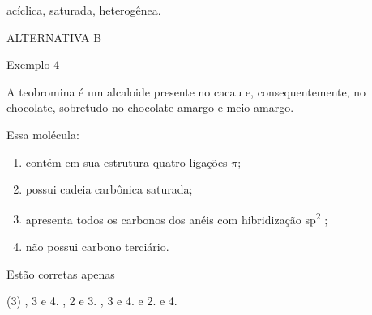\documentclass[presentation,professionalfonts,aspectratio=169]{beamer}
\begin{document}
\begin{frame}[label={sec:orgcf9bfd3}]{}
\begin{answer}[print=true]





\alert{acíclica, saturada, heterogênea.}


ALTERNATIVA \alert{B}
\end{answer}
\end{frame}
\begin{frame}[label={sec:org5857adc}]{Exemplo 4}
\begin{question}
\scriptsize
A teobromina é um alcaloide presente no cacau e, consequentemente, no chocolate, sobretudo no chocolate amargo e meio amargo. 

\begin{minipage}[b]{2.5cm}

\end{minipage}\hfill
\begin{minipage}[b]{8cm}
Essa molécula:
\begin{enumerate}[label=\Roman*]
\item contém em sua estrutura quatro ligações \(\pi\);
\item possui cadeia carbônica saturada;
\item apresenta todos os carbonos dos anéis com hibridização sp\textsuperscript{2} ;
\item não possui carbono terciário.
\end{enumerate}
\end{minipage}

Estão corretas apenas  

\begin{choice}(3)
, 3 e 4.
, 2 e 3.
, 3 e 4.
 e 2.
 e 4.​
\end{choice}
\end{question}
\end{frame}
\end{document}
